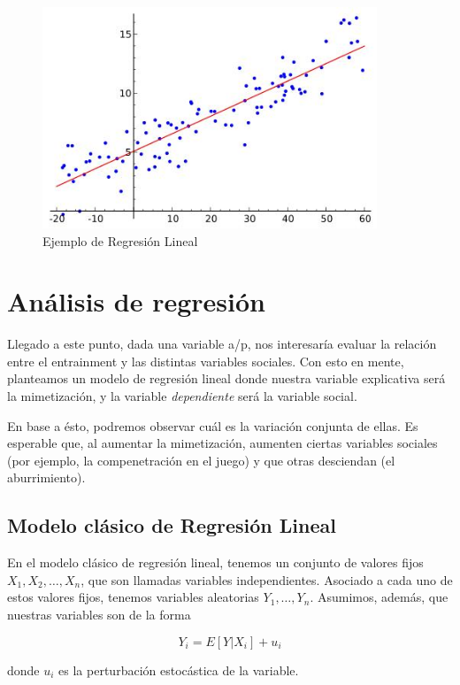 
\begin{figure}
\centering
\includegraphics[width=10cm]{images/linear_regression.jpg}
\caption{Ejemplo de Regresión Lineal}
\end{figure}

\section{Análisis de regresión}

Llegado a este punto, dada una variable a/p, nos interesaría evaluar la relación entre el entrainment y las distintas variables sociales. Con esto en mente, planteamos un modelo de regresión lineal donde nuestra variable explicativa será la mimetización, y la variable \emph{dependiente} será la variable social.

En base a ésto, podremos observar cuál es la variación conjunta de ellas. Es esperable que, al aumentar la mimetización, aumenten ciertas variables sociales (por ejemplo, la compenetración en el juego) y que otras desciendan (el aburrimiento).


\subsection{Modelo clásico de Regresión Lineal}

En el modelo clásico de regresión lineal, tenemos un conjunto de valores fijos $X_1, X_2, \ldots, X_n$, que son llamadas variables independientes. Asociado a cada uno de estos valores fijos, tenemos variables aleatorias $Y_1, \ldots, Y_n$. Asumimos, además, que nuestras variables son de la forma

\begin{equation}
  Y_i = E[Y|X_i] + u_i
\end{equation}

donde $u_i$ es la perturbación estocástica de la variable.

